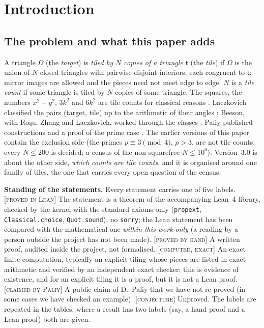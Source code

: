 \documentclass[11pt,reqno]{amsart}
\theoremstyle{plain}
\theoremstyle{definition}
\newcommand{\lab}[1]{\textup{[\textsc{#1}]}}
\newcommand{\PL}{\lab{proved in Lean}}
\newcommand{\PH}{\lab{proved by hand}}
\newcommand{\CE}{\lab{computed, exact}}
\newcommand{\CP}{\lab{claimed by Paliy}}
\newcommand{\CJ}{\lab{conjecture}}
\newcommand{\tile}{\mathsf{t}}
\begin{document}
\section{Introduction}\label{sec:intro}

\subsection{The problem and what this paper adds}
A triangle $\Omega$ (the \emph{target}) is \emph{tiled by $N$ copies of a triangle $\tile$} (the \emph{tile}) if $\Omega$ is the union of $N$ closed triangles with pairwise disjoint interiors, each congruent to $\tile$; mirror images are allowed and the pieces need not meet edge to edge.
$N$ is a \emph{tile count} if some triangle is tiled by $N$ copies of some triangle.
The squares, the numbers $x^2+y^2$, $3k^2$ and $6k^2$ are tile counts for classical reasons \cite{Soifer,SWW}.
Laczkovich classified the pairs (target, tile) up to the arithmetic of their angles \cite{Laczkovich1995,Laczkovich2012}; Beeson, with Ro\c{s}u, Zhang and Laczkovich, worked through the classes \cite{BeesonI,BeesonIII,BeesonIso,BeesonRosu,Zhang,Erdos633}.
Paliy published constructions and a proof of the prime case \cite{PaliyPrime,PaliyRepo}.
The earlier versions of this paper \cite{Release22,ReleasePaper} contain the exclusion side (the primes $p\equiv3\pmod4$, $p>3$, are not tile counts; every $N\le200$ is decided; a census of the non-squarefree $N\le10^6$).
Version~3.0 is about the other side, \emph{which counts are tile counts}, and it is organised around one family of tiles, the one that carries every open question of the census.

\medskip\noindent\textbf{Standing of the statements.}
Every statement carries one of five labels.
\PL{} The statement is a theorem of the accompanying Lean~4 library, checked by the kernel with the standard axioms only (\texttt{propext}, \texttt{Classical.choice}, \texttt{Quot.sound}), no \texttt{sorry}; the Lean statement has been compared with the mathematical one \emph{within this work only} (a reading by a person outside the project has not been made).
\PH{} A written proof, audited inside the project, not formalised.
\CE{} An exact finite computation, typically an explicit tiling whose pieces are listed in exact arithmetic and verified by an independent exact checker; this is evidence of existence, and for an explicit tiling it is a proof, but it is not a Lean proof.
\CP{} A public claim of D.~Paliy that we have not re-proved (in some cases we have checked an example).
\CJ{} Unproved.
The labels are repeated in the tables; where a result has two labels (say, a hand proof and a Lean proof) both are given.
\end{document}

